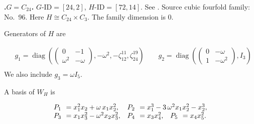 \documentclass[12pt]{amsart}
\makeatletter
\numberwithin{equation}{section}
\theoremstyle{plain}
\theoremstyle{definition}
\theoremstyle{remark}
\DeclareMathOperator{\diag}{diag}
\newcommand{\PBasisLabel}[1]{\mathrlap{P_{#1}}\phantom{P_{99}}}
\newenvironment{SecEightAlignedBasis}[1]{%
  \begingroup\renewcommand{\arraystretch}{1.18}%
  \[\begin{array}{@{}#1@{}}%
}{\end{array}\]\endgroup}
\newenvironment{familydisplay}{%
  \begingroup
  \setlength{\arraycolsep}{1.35pt}%
  \renewcommand{\arraystretch}{0.96}%
  \setlength{\jot}{2pt}%
}{\endgroup}
\newcommand{\smat}[1]{\left(\begin{smallmatrix}#1\end{smallmatrix}\right)}
\makeatother
\begin{document}
\par{}\medskip\noindent\textbf{.\enspace $G=C_{24}$.}\label{fam:threefold-no-24}
$G\text{-ID}=[24,2]$, $H\text{-ID}=[72,14]$.
See \cite[Example~3.1(3)]{LiYuThreefold}.
Source cubic fourfold family: No.~96.  Here
$H\cong C_{24}\times C_3$.
The family dimension is $0$.
\par\smallskip\noindent Generators of $H$ are\par\nopagebreak
\begin{familydisplay}
\begin{align*}
&g_{1}=\diag\!\left(\smat{0&-1\\\omega^2&-\omega},-\omega^2,-\zeta_{12}^{11},\zeta_{24}^{19}\right)
\qquad g_{2}=\diag\!\left(\smat{0&-\omega\\1&-\omega^2},I_3\right)\\
\end{align*}
\end{familydisplay}
\noindent We also include $g_{3}=\omega I_5$.
\par\smallskip\noindent A basis of $W_H$ is\par\nopagebreak
\begin{familydisplay}
\begin{SecEightAlignedBasis}{l@{\quad}l@{\quad}l}
\PBasisLabel{1}=x_{1}^{2}x_{2}+\omega\,x_{1}x_{2}^{2}, & \multicolumn{2}{@{}l@{}}{\PBasisLabel{2}=x_{1}^{3}-3\,\omega^2x_{1}x_{2}^{2}-x_{2}^{3},}\\
\PBasisLabel{3}=x_{1}x_{3}^{2}-\omega^2x_{2}x_{3}^{2}, & \PBasisLabel{4}=x_{3}x_{4}^{2}, & \PBasisLabel{5}=x_{4}x_{5}^{2}.
\end{SecEightAlignedBasis}
\end{familydisplay}
\end{document}

